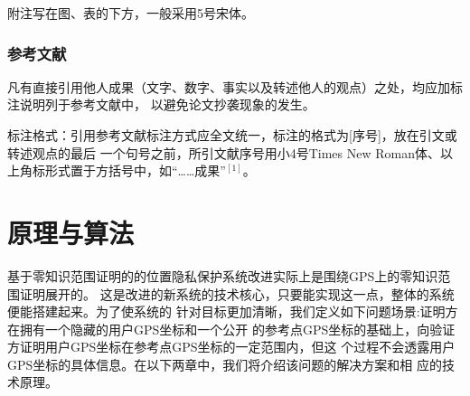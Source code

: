 \documentclass[zihao=-4]{ctexart}
\begin{document}
\begin{spacing}{1.5}
附注写在图、表的下方，一般采用5号宋体。

\subsubsection{参考文献}
凡有直接引用他人成果（文字、数字、事实以及转述他人的观点）之处，均应加标注说明列于参考文献中，
以避免论文抄袭现象的发生。

标注格式：引用参考文献标注方式应全文统一，标注的格式为[序号]，放在引文或转述观点的最后
一个句号之前，所引文献序号用小4号Times New Roman体、以上角标形式置于方括号中，如“……成果”$^{[1]}$。

\section{原理与算法}
基于零知识范围证明的的位置隐私保护系统改进实际上是围绕GPS上的零知识范围证明展开的。
这是改进的新系统的技术核心，只要能实现这一点，整体的系统便能搭建起来。为了使系统的
针对目标更加清晰，我们定义如下问题场景:证明方在拥有一个隐藏的用户GPS坐标和一个公开
的参考点GPS坐标的基础上，向验证方证明用户GPS坐标在参考点GPS坐标的一定范围内，但这
个过程不会透露用户GPS坐标的具体信息。在以下两章中，我们将介绍该问题的解决方案和相
应的技术原理。

\end{spacing}
\end{document}
